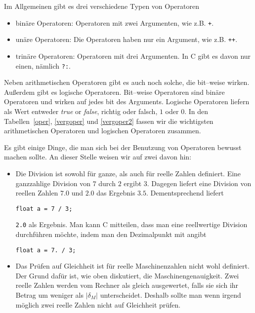 Im Allgemeinen gibt es drei verschiedene Typen von Operatoren
\begin{itemize}
\item binäre Operatoren: Operatoren mit zwei Argumenten, wie z.B. \verb|+|.
\item unäre Operatoren: Die Operatoren haben nur ein Argument, wie z.B. \verb|++|.
\item trinäre Operatoren: Operatoren mit drei Argumenten. In C gibt es davon nur einen, nämlich \verb|?:|.
\end{itemize} 
Neben arithmetischen Operatoren gibt es auch noch solche, die bit--weise wirken. 
Außerdem gibt es logische Operatoren.
Bit--weise Operatoren sind binäre Operatoren und wirken auf jedes bit des Arguments.
Logische Operatoren liefern als Wert entweder \emph{true} or \emph{false}, richtig oder falsch, $1$ oder $0$.
In den Tabellen~\ref{oper}, \ref{vergoper} und \ref{vergoper2} fassen wir die wichtigsten arithmetischen Operatoren und logischen Operatoren zusammen.

Es gibt einige Dinge, die man sich bei der Benutzung von Operatoren bewusst machen sollte.
An dieser Stelle weisen wir auf zwei davon hin:
\begin{itemize}
\item Die Division ist sowohl für ganze, als auch für reelle Zahlen definiert. 
  Eine ganzzahlige Division von $7$ durch $2$ ergibt $3$.
  Dagegen liefert eine Division von reellen Zahlen $7.0$ und $2.0$ das Ergebnis $3.5$.
  Dementsprechend liefert
  \begin{lstlisting}
float a = 7 / 3;
  \end{lstlisting}
  \verb|2.0| als Ergebnis. 
  Man kann C mitteilen, dass man eine reellwertige Division durchführen möchte, indem man den Dezimalpunkt mit angibt
  \begin{lstlisting}
float a = 7. / 3;
  \end{lstlisting}
  
\item Das Prüfen auf Gleichheit ist für reelle Maschinenzahlen nicht wohl definiert.
  Der Grund dafür ist, wie oben diskutiert, die Maschinengenauigkeit.
  Zwei reelle Zahlen werden vom Rechner als gleich ausgewertet, falls sie sich ihr Betrag um weniger als $|\delta_M|$ unterscheidet. 
  Deshalb sollte man wenn irgend möglich zwei reelle Zahlen nicht auf Gleichheit prüfen.

\end{itemize}



